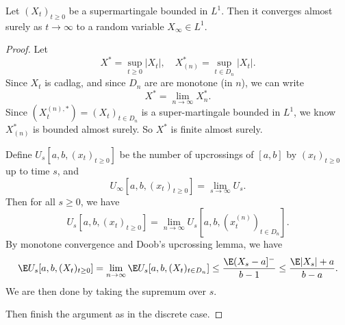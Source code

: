 \documentclass[a4paper]{article}
\begin{document}
\begin{thm}
  Let $(X_t)_{t \geq 0}$ be a supermartingale bounded in $L^1$. Then it converges almost surely as $t \to \infty$ to a random variable $X_\infty \in L^1$.
\end{thm}

\begin{proof}
  Let
  \[
    X^* = \sup_{t \geq 0} |X_t|,\quad X_{(n)}^* = \sup_{t \in D_n} |X_t|.
  \]
  Since $X_t$ is cadlag, and since $D_n$ are are monotone (in $n$), we can write
  \[
    X^* = \lim_{n \to \infty} X_n^*.
  \]
  Since $(X_t^{(n), *}) = (X_t)_{t \in D_n}$ is a super-martingale bounded in $L^1$, we know $X^*_{(n)}$ is bounded almost surely. So $X^*$ is finite almost surely.

  Define $U_s[a, b, (x_t)_{t \geq 0}]$ be the number of upcrossings of $[a, b]$ by $(x_t)_{t \geq 0}$ up to time $s$, and
  \[
    U_\infty[a, b, (x_t)_{t \geq 0}] = \lim_{s \to \infty} U_s.
  \]
  Then for all $s \geq 0$, we have
  \[
    U_s[a, b, (x_t)_{t \geq 0}] = \lim_{n \to \infty} U_s[a, b, (x_t^{(n)})_{t \in D_n}].
  \]
  By monotone convergence and Doob's upcrossing lemma, we have
  \[
    \E U_s[a, b, (X_t)_{t \geq 0}] = \lim_{n \to \infty} \E U_s[a, b, (X_t)_{t \in D_n}] \leq \frac{\E(X_s - a]^-}{b - 1} \leq \frac{\E |X_s| + a}{b - a}. %
  \]
  We are then done by taking the supremum over $s$.

  Then finish the argument as in the discrete case.
\end{proof}
\printindex
\end{document}
